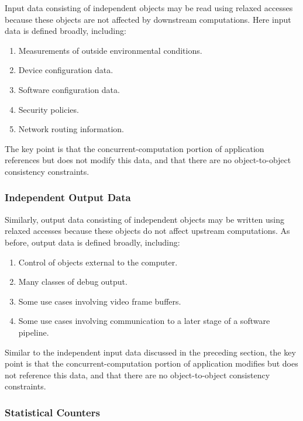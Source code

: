 \documentclass[10]{article}
\begin{document}
Input data consisting of independent objects may be read using relaxed
accesses because these objects are not affected by downstream computations.
Here input data is defined broadly, including:

\begin{enumerate}
\item	Measurements of outside environmental conditions.
\item	Device configuration data.
\item	Software configuration data.
\item	Security policies.
\item	Network routing information.
\end{enumerate}

The key point is that the concurrent-computation portion of application
references but does not modify this data, and that there are no
object-to-object consistency constraints.

\subsubsection{Independent Output Data}
\label{sec:Independent Output Data}

Similarly, output data consisting of independent objects may be written
using relaxed accesses because these objects do not affect upstream
computations.
As before, output data is defined broadly, including:

\begin{enumerate}
\item	Control of objects external to the computer.
\item	Many classes of debug output.
\item	Some use cases involving video frame buffers.
\item	Some use cases involving communication to a later stage of a
	software pipeline.
\end{enumerate}

Similar to the independent input data discussed in the preceding section,
the key point is that the concurrent-computation portion of application
modifies but does not reference this data, and that there are no
object-to-object consistency constraints.

\subsubsection{Statistical Counters}
\label{sec:Statistical Counters}
\end{document}
